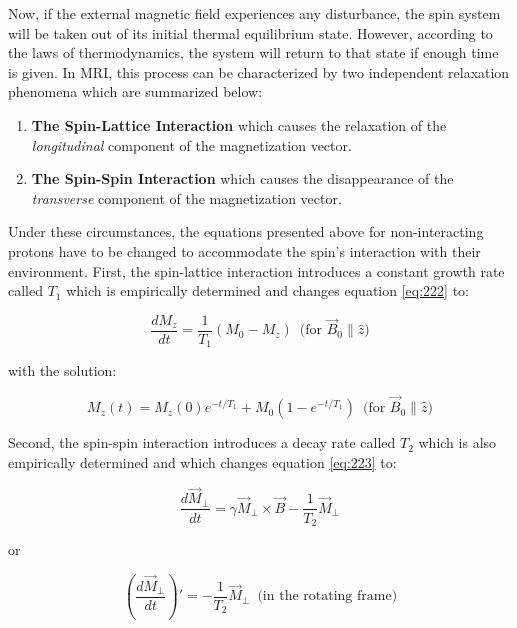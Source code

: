 Now, if the external magnetic field experiences any disturbance, the spin system will be taken out of its initial thermal equilibrium state. However, according to the laws of thermodynamics, the system will return to that state if enough time is given. In MRI, this process can be characterized by two independent relaxation phenomena which are summarized below:

\begin{enumerate}
    \item \textbf{The Spin-Lattice Interaction} which causes the relaxation of the \textit{longitudinal} component of the magnetization vector.
    
    \item \textbf{The Spin-Spin Interaction} which causes the disappearance of the \textit{transverse} component of the magnetization vector.
\end{enumerate}

Under these circumstances, the equations presented above for non-interacting protons have to be changed to accommodate the spin's interaction with their environment. First, the spin-lattice interaction introduces a constant growth rate called $T_1$ which is empirically determined and changes equation \ref{eq:222} to:

\begin{equation} \label{eq:226}
    \frac{dM_z}{dt} = \frac{1}{T_1} (M_0 - M_z) \, \text{ (for } \vec{B}_0 \parallel \hat{z} \text{)}
\end{equation}

with the solution:

\begin{equation} \label{eq:227}
    M_z(t) = M_z(0) e^{-t/T_1} + M_0(1-e^{-t/T_1}) \, \text{ (for } \vec{B}_0 \parallel \hat{z} \text{)}
\end{equation}

Second, the spin-spin interaction introduces a decay rate called $T_2$ which is also empirically determined and which changes equation \ref{eq:223} to:

\begin{equation} \label{eq:228}
    \frac{d\vec{M}_{\perp}}{dt} = \gamma \vec{M}_{\perp} \times \vec{B} - \frac{1}{T_2} \vec{M}_{\perp}
\end{equation}

or 

\begin{equation} \label{eq:229}
    (\frac{d\vec{M}_{\perp}}{dt})' = - \frac{1}{T_2} \vec{M}_{\perp} \, \text{ (in the rotating frame)} 
\end{equation}


